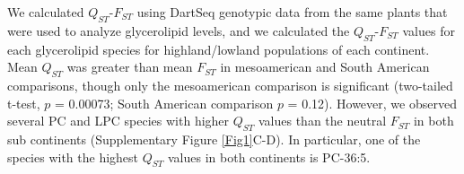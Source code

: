 \documentclass[9pt,twocolumn,twoside,lineno]{BioRxiv}
\begin{document}
We calculated $Q_{ST}$-$F_{ST}$ using DartSeq genotypic data from the same plants that were used to analyze glycerolipid levels, and we calculated the $Q_{ST}$-$F_{ST}$ values for each glycerolipid species for highland/lowland populations of each continent. 
Mean $Q_{ST}$ was greater than mean $F_{ST}$ in mesoamerican and South American comparisons, though only the mesoamerican comparison is significant (two-tailed t-test, $p$ = 0.00073; South American comparison $p$ = 0.12).
However, we observed several PC and LPC species with higher $Q_{ST}$ values than the neutral $F_{ST}$ in both sub continents (Supplementary Figure \ref{Fig1}C-D).
In particular, one of the species with the highest $Q_{ST}$ values in both continents is PC-36:5. 
%
\end{document}
